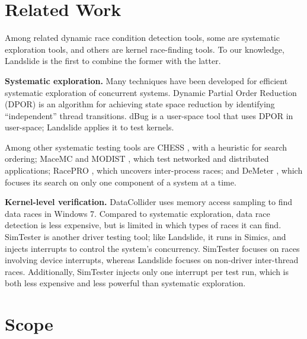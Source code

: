 \documentclass{llncs}
\begin{document}
\section{Related Work}

Among related dynamic race condition detection tools, some are systematic exploration tools, and others are kernel race-finding tools. To our knowledge, Landslide is the first to combine the former with the latter.

{\bf Systematic exploration.} Many techniques have been developed for efficient systematic exploration of concurrent systems. Dynamic Partial Order Reduction (DPOR) \cite{dpor} is an algorithm for achieving state space reduction by identifying ``independent'' thread transitions. dBug \cite{dbug-ssv} is a user-space tool that uses DPOR in user-space; Landslide applies it to test kernels.

Among other systematic testing tools are CHESS \cite{chess}, with a heuristic for search ordering; MaceMC \cite{macemc} and MODIST \cite{modist}, which test networked and distributed applications; RacePRO \cite{racepro}, which uncovers inter-process races; and DeMeter \cite{demeter}, which focuses its search on only one component of a system at a time.

{\bf Kernel-level verification.}
DataCollider \cite{datacollider} uses memory access sampling to find data races in Windows 7. Compared to systematic exploration, data race detection is less expensive, but is limited in which types of races it can find.
SimTester \cite{simtester} is another driver testing tool; like Landslide, it runs in Simics, and injects interrupts to control the system's concurrency. SimTester focuses on races involving device interrupts, whereas Landslide focuses on non-driver inter-thread races. Additionally, SimTester injects only one interrupt per test run, which is both less expensive and less powerful than systematic exploration.

\section{Scope}
\end{document}
